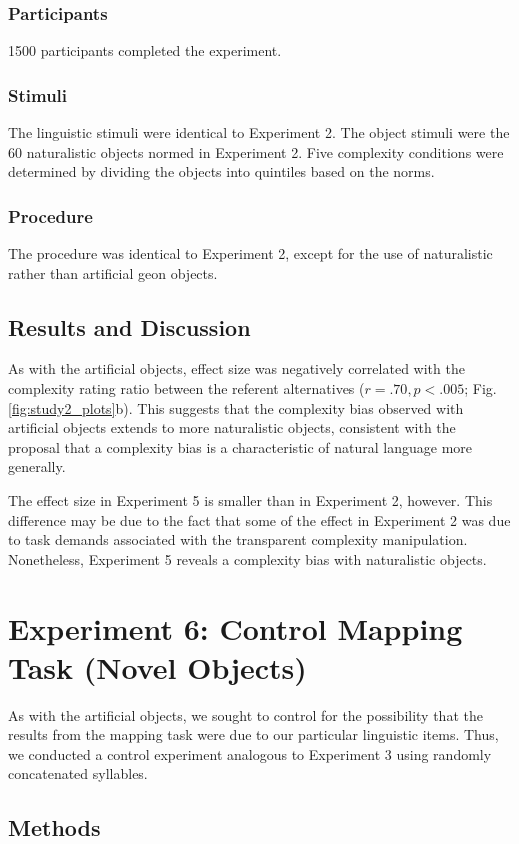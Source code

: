 \documentclass[man]{apa2}
\begin{document}
\subsubsection{Participants} 1500 participants completed the experiment.
\subsubsection{Stimuli} The linguistic stimuli were identical to Experiment 2. The object stimuli were the 60 naturalistic objects normed in Experiment 2. Five complexity conditions were determined by dividing the objects into quintiles based on the norms.

\subsubsection{Procedure} The procedure was identical to Experiment 2, except for the use of naturalistic rather than artificial geon objects.

\subsection{Results and Discussion}
As with the artificial objects, effect size was negatively correlated with the complexity rating ratio between the referent alternatives ($r = .70, p < .005$; Fig. \ref{fig:study2_plots}b). This suggests that the complexity bias observed with artificial objects extends to more naturalistic objects, consistent with the proposal that a complexity bias is a characteristic of natural language more generally.

The effect size in Experiment 5 is smaller than in Experiment 2, however. This difference may be due to the fact that some of the effect in Experiment 2 was due to task demands associated with the transparent complexity manipulation. Nonetheless, Experiment 5 reveals a complexity bias with naturalistic objects.

\section{Experiment 6: Control Mapping Task (Novel Objects)}
As with the artificial objects, we sought to control for the possibility that the results from the mapping task were due to our particular linguistic items. Thus, we conducted a control experiment analogous to Experiment 3 using randomly concatenated syllables.

\subsection{Methods}
\end{document}

